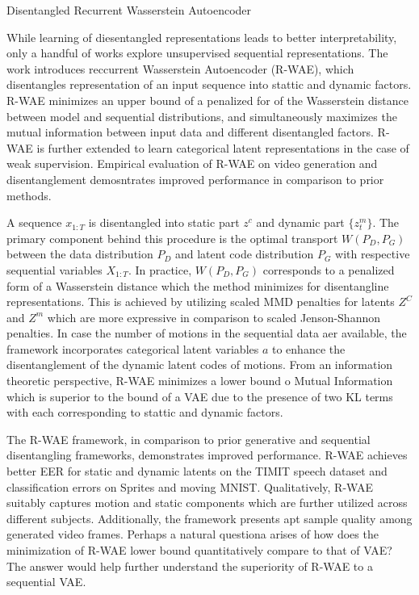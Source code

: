 \documentclass[12pt,letterpaper]{article}
\begin{document}
\begin{center}
  \large{Disentangled Recurrent Wasserstein Autoencoder}
\end{center}

While learning of diesentangled representations leads to better interpretability, only a handful of works explore unsupervised sequential representations. The work introduces reccurrent Wasserstein Autoencoder (R-WAE), which disentangles representation of an input sequence into stattic and dynamic factors. R-WAE minimizes an upper bound of a penalized for of the Wasserstein distance between model and sequential distributions, and simultaneously maximizes the mutual information between input data and different disentangled factors. R-WAE is further extended to learn categorical latent representations in the case of weak supervision. Empirical evaluation of R-WAE on video generation and disentanglement demosntrates improved performance in comparison to prior methods.

A sequence $x_{1:T}$ is disentangled into static part $z^{c}$ and dynamic part $\{z_{t}^{m}\}$. The primary component behind this procedure is the optimal transport $W(P_{D}, P_{G})$ between the data distribution $P_{D}$ and latent code distribution $P_{G}$ with respective sequential variables $X_{1:T}$. In practice, $W(P_{D},P_{G})$ corresponds to a penalized form of a Wasserstein distance which the method minimizes for disentangline representations. This is achieved by utilizing scaled MMD penalties for latents $Z^{C}$ and $Z^{m}$ which are more expressive in comparison to scaled Jenson-Shannon penalties. In case the number of motions in the sequential data aer available, the framework incorporates categorical latent variables $a$ to enhance the disentanglement of the dynamic latent codes of motions. From an information theoretic perspective, R-WAE minimizes a lower bound o Mutual Information which is superior to the bound of a VAE due to the presence of two KL terms with each corresponding to stattic and dynamic factors.

The R-WAE framework, in comparison to prior generative and sequential disentangling frameworks, demonstrates improved performance. R-WAE achieves better EER for static and dynamic latents on the TIMIT speech dataset and classification errors on Sprites and moving MNIST. Qualitatively, R-WAE suitably captures motion and static components which are further utilized across different subjects. Additionally, the framework presents apt sample quality among generated video frames. Perhaps a natural questiona arises of how does the minimization of R-WAE lower bound quantitatively compare to that of VAE? The answer would help further understand the superiority of R-WAE to a sequential VAE. 
\end{document}
